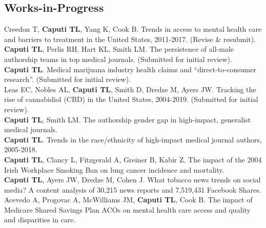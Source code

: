 \documentclass[10pt, letterpaper]{article}
\begin{document}
\subsection*{Works-in-Progress}
\noindent
Creedon T, \textbf{Caputi TL}, Yang K, Cook B. Trends in access to mental health care and barriers to treatment in the United States, 2011-2017. (Revise \& resubmit).\\[.2cm]
\textbf{Caputi TL}, Perlis RH, Hart KL, Smith LM. The persistence of all-male authorship teams in top medical journals. (Submitted for initial review).\\[.2cm]
\textbf{Caputi TL}. Medical marijuana industry health claims and “direct-to-consumer research”. (Submitted for initial review).\\[.2cm]
Leas EC, Nobles AL, \textbf{Caputi TL}, Smith D, Dredze M, Ayers JW. Tracking the rise of cannabidiol (CBD) in the United States, 2004-2019. (Submitted for initial review).\\[.2cm]
\textbf{Caputi TL}, Smith LM. The authorship gender gap in high-impact, generalist medical journals.\\[.2cm]
\textbf{Caputi TL}. Trends in the race/ethnicity of high-impact medical journal authors, 2005-2018.\\[.2cm]
\textbf{Caputi TL}, Clancy L, Fitzgerald A, Greiner B, Kabir Z. The impact of the 2004 Irish Workplace Smoking Ban on lung cancer incidence and mortality.\\[.2cm]
\textbf{Caputi TL}, Ayers JW, Dredze M, Cohen J. What tobacco news trends on social media? A content analysis of 30,215 news reports and 7,519,431 Facebook Shares.\\[.2cm]
Acevedo A, Progovac A, McWilliams JM, \textbf{Caputi TL}, Cook B. The impact of Medicare Shared Savings Plan ACOs on mental health care access and quality and disparities in care.\\[.2cm]
\end{document}
